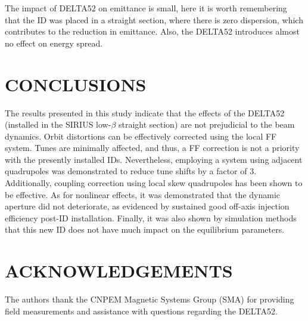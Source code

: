 \documentclass[a4paper,
               keeplastbox,   %
               ]{jacow}
\begin{document}
The impact of DELTA52 on emittance is small, here it is worth remembering that the ID was placed in a straight section, where there is zero dispersion, which contributes to the reduction in emittance. Also, the DELTA52 introduces almost no effect on energy spread.

\section{CONCLUSIONS}

The results presented in this study indicate that the effects of the DELTA52 (installed in the SIRIUS low-$\beta$ straight section) are not prejudicial to the beam dynamics. Orbit distortions can be effectively corrected using the local FF system. Tunes are minimally affected, and thus, a FF correction is not a priority with the presently installed IDs. Nevertheless, employing a system using adjacent quadrupoles was demonstrated to reduce tune shifts by a factor of 3. Additionally, coupling correction using local skew quadrupoles has been shown to be effective. As for nonlinear effects, it was demonstrated that the dynamic aperture did not deteriorate, as evidenced by sustained good off-axis injection efficiency post-ID installation.
Finally, it was also shown by simulation methods that this new ID does not have much impact on the equilibrium parameters. 

\section{ACKNOWLEDGEMENTS}
The authors thank the CNPEM Magnetic Systems Group (SMA) for providing field measurements and assistance with questions regarding the DELTA52.
\end{document}
